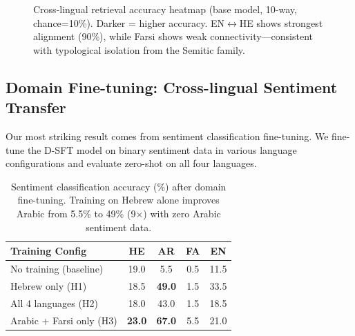 \documentclass[10pt,twocolumn]{article}
\begin{document}
\begin{figure}[H]
\centering
{}
\caption{Cross-lingual retrieval accuracy heatmap (base model, 10-way, chance=10\%). Darker = higher accuracy. EN$\leftrightarrow$HE shows strongest alignment (90\%), while Farsi shows weak connectivity---consistent with typological isolation from the Semitic family.}
\label{fig:embedding_heatmap}
\end{figure}

\subsection{Domain Fine-tuning: Cross-lingual Sentiment Transfer}
\label{sec:sentiment}

Our most striking result comes from sentiment classification fine-tuning. We fine-tune the D-SFT model on binary sentiment data in various language configurations and evaluate zero-shot on all four languages.

\begin{table}[H]
\centering\small
\begin{tabular}{lcccc}
\toprule
\textbf{Training Config} & \textbf{HE} & \textbf{AR} & \textbf{FA} & \textbf{EN} \\
\midrule
No training (baseline) & 19.0 & 5.5 & 0.5 & 11.5 \\
Hebrew only (H1) & 18.5 & \textbf{49.0} & 1.5 & 33.5 \\
All 4 languages (H2) & 18.0 & 43.0 & 1.5 & 18.5 \\
Arabic + Farsi only (H3) & \textbf{23.0} & \textbf{67.0} & 5.5 & 21.0 \\
\bottomrule
\end{tabular}
\caption{Sentiment classification accuracy (\%) after domain fine-tuning. Training on Hebrew alone improves Arabic from 5.5\% to 49\% (9$\times$) with zero Arabic sentiment data.}
\label{tab:sentiment}
\end{table}
\end{document}
